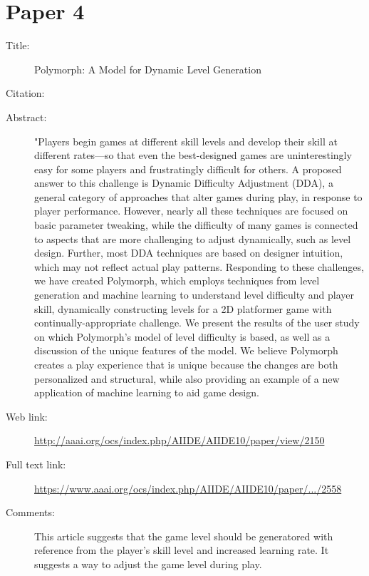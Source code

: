 \documentclass{scrartcl}
\begin{document}
\section*{Paper 4}
\begin{description}
\item[Title:] Polymorph: A Model for Dynamic Level Generation
\item[Citation:] \cite{Jennings:2010}
\item[Abstract:] "Players begin games at different skill levels and develop their skill at different rates—so that even the best-designed games are uninterestingly easy for some players and frustratingly difficult for others. A proposed answer to this challenge is Dynamic Difficulty Adjustment (DDA), a general category of approaches that alter games during play, in response to player performance. However, nearly all these techniques are focused on basic parameter tweaking,
while the difficulty of many games is connected to aspects that are more challenging to adjust dynamically, such as level design. Further, most DDA techniques are based on designer intuition, which may not reflect actual play patterns. Responding to these challenges, we have created Polymorph, which employs techniques from level generation and machine learning to understand level difficulty and player skill, dynamically constructing levels for a 2D platformer game with continually-appropriate challenge. We present the results of the user study on which Polymorph's model of level difficulty is based, as well as a discussion of the unique features of the model. We believe Polymorph creates a play experience that is unique because the changes are both personalized and structural, while also providing an example of a new application of machine learning to aid game design.
\item[Web link:] \url{http://aaai.org/ocs/index.php/AIIDE/AIIDE10/paper/view/2150}
\item[Full text link:] \url{https://www.aaai.org/ocs/index.php/AIIDE/AIIDE10/paper/.../2558}
\item[Comments:] This article suggests that the game level should be generatored with reference from the player's skill level and increased learning rate. It suggests a way to adjust the game level during play.
\end{description}
\end{document}
